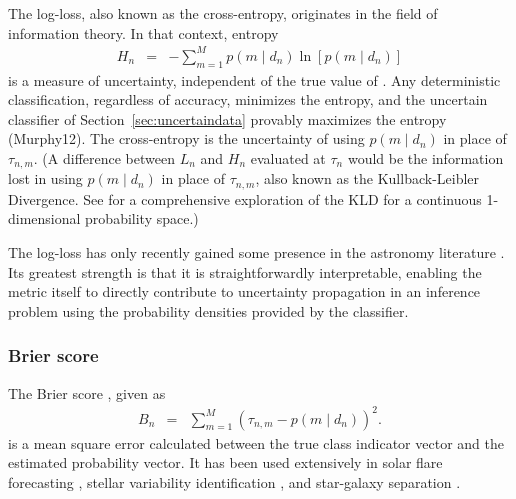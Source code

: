 The log-loss, also known as the cross-entropy, originates in the field of information theory.
In that context, entropy
\begin{eqnarray}
  \label{eq:entropy}
  H_{n} &=& -\sum_{m=1}^{M}p(m \mid d_{n})\ln[p(m \mid d_{n})]
\end{eqnarray}
is a measure of uncertainty, independent of the true value of .
Any deterministic classification, regardless of accuracy, minimizes the entropy, and the uncertain classifier of Section~\ref{sec:uncertaindata} provably maximizes the entropy (Murphy12).
The cross-entropy
is the uncertainty of using $p(m \mid d_{n})$ in place of $\tau_{n, m}$.
(A difference between $L_{n}$ and $H_{n}$ evaluated at $\tau_{n}$ would be the information lost in using $p(m \mid d_{n})$ in place of $\tau_{n, m}$, also known as the Kullback-Leibler Divergence.
See \cite{2018AJ....156...35M} for a comprehensive exploration of the KLD for a continuous 1-dimensional probability space.)

The log-loss has only recently gained some presence in the astronomy literature \citep{hon_deep_2017, hon_deep_2018}. Its greatest strength is that it is straightforwardly interpretable, enabling the metric itself to directly contribute to uncertainty propagation in an inference problem using the probability densities provided by the classifier.
\subsubsection{Brier score}
\label{sec:brier}

The Brier score \cite{brier_verification_1950}, given as
\begin{eqnarray}
  \label{eq:brier}
B_{n} &=& \sum_{m=1}^{M}(\tau_{n, m}-p(m \mid d_{n}))^{2}.
\end{eqnarray}
is a mean square error calculated between the true class indicator vector and the estimated probability vector.
It has been used extensively in solar flare forecasting \cite{crown_validation, mays_ensemble_2015, florios_forecasting_2018}, stellar variability identification \citep{richards_construction_2012, armstrong_k2_2016}, and star-galaxy separation \citep{kim_hybrid_2015}.

